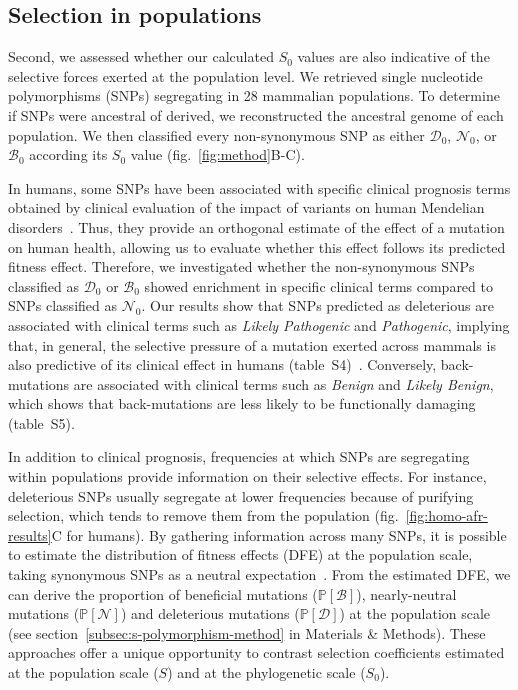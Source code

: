 \documentclass{article}
\newcommand{\proba}{\mathbb{P}}
\newcommand{\Sphy}{S_{0}}
\newcommand{\SphyDel}{\mathcal{D}_0}
\newcommand{\SphyNeu}{\mathcal{N}_0}
\newcommand{\SphyBen}{\mathcal{B}_0}
\newcommand{\Spop}{S}
\newcommand{\SpopDel}{\mathcal{D}}
\newcommand{\SpopNeu}{\mathcal{N}}
\newcommand{\SpopBen}{\mathcal{B}}
\newcommand{\ProbaPopDel}{\proba [ \SpopDel]}
\newcommand{\ProbaPopNeu}{\proba [ \SpopNeu ]}
\newcommand{\ProbaPopBen}{\proba [ \SpopBen ]}
\begin{document}
    \subsection*{Selection in populations}
    Second, we assessed whether our calculated $\Sphy$ values are also indicative of the selective forces exerted at the population level.
    We retrieved single nucleotide polymorphisms (SNPs) segregating in 28 mammalian populations.
    To determine if SNPs were ancestral of derived, we reconstructed the ancestral genome of each population.
    We then classified every non-synonymous SNP as either $\SphyDel$, $\SphyNeu$, or $\SphyBen$ according its $\Sphy$ value (fig.~\ref{fig:method}B-C).

    In humans, some SNPs have been associated with specific clinical prognosis terms obtained by clinical evaluation of the impact of variants on human Mendelian disorders~\cite{landrum_clinvar_2018}.
    Thus, they provide an orthogonal estimate of the effect of a mutation on human health, allowing us to evaluate whether this effect follows its predicted fitness effect.
    Therefore, we investigated whether the non-synonymous SNPs classified as $\SphyDel$ or $\SphyBen$ showed enrichment in specific clinical terms compared to SNPs classified as $\SphyNeu$.
    Our results show that SNPs predicted as deleterious are associated with clinical terms such as \textit{Likely Pathogenic} and \textit{Pathogenic}, implying that, in general, the selective pressure of a mutation exerted across mammals is also predictive of its clinical effect in humans (table~S4)~\cite{sullivan_leveraging_2023}.
    Conversely, back-mutations are associated with clinical terms such as \textit{Benign} and \textit{Likely Benign}, which shows that back-mutations are less likely to be functionally damaging (table~S5).

    In addition to clinical prognosis, frequencies at which SNPs are segregating within populations provide information on their selective effects.
    For instance, deleterious SNPs usually segregate at lower frequencies because of purifying selection, which tends to remove them from the population (fig.~\ref{fig:homo-afr-results}C for humans).
    By gathering information across many SNPs, it is possible to estimate the distribution of fitness effects (DFE) at the population scale, taking synonymous SNPs as a neutral expectation~\cite{eyre-walker_distribution_2006, eyre-walker_estimating_2009, galtier_adaptive_2016, tataru_inference_2017}.
    From the estimated DFE, we can derive the proportion of beneficial mutations ($\ProbaPopBen$), nearly-neutral mutations ($\ProbaPopNeu$) and deleterious mutations ($\ProbaPopDel$) at the population scale (see section~\ref{subsec:s-polymorphism-method} in Materials \& Methods).
    These approaches offer a unique opportunity to contrast selection coefficients estimated at the population scale ($\Spop$) and at the phylogenetic scale ($\Sphy$).
\end{document}
